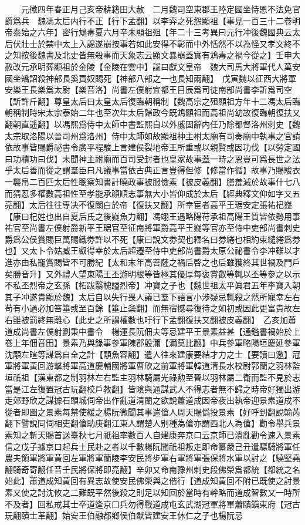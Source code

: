 　　元徽四年春正月己亥帝耕籍田大赦　二月魏司空東郡王陸定國坐恃恩不法免官爵爲兵　魏馮太后内行不正【行下孟翻】以李弈之死怨顯祖【事見一百三十二卷明帝泰始之六年】密行鴆毒夏六月辛未顯祖殂【年二十三考異曰元行冲後魏國典云太后伏壯士於禁中太上入謁遂崩按事若如此安得不彰而中外恬然不以為怪又孝文終不之知按後魏書及北史皆無殺事而天象志云顯文暴崩蓋實有鴆毒之禍今從之】壬申大赦改元承明葬顯祖於金陵【金陵在雲中】諡曰獻文皇帝　魏大司馬大將軍代人萬安國坐矯詔殺神部長奚買奴賜死【神部八部之一也長知兩翻】　戊寅魏以征西大將軍安樂王長樂爲太尉【樂音洛】尚書左僕射宜都王目辰爲司徒南部尚書李訢爲司空【訢許斤翻】尊皇太后曰太皇太后復臨朝稱制【魏高宗之殂顯祖方年十二馮太后臨朝稱制時宋太宗泰始二年也至次年太后歸政今既鴆顯祖而高祖尚幼故復臨朝復扶又翻朝直遥翻】以馮熙爲侍中太師中書監熙自以外戚固辭内任乃除都督洛州刺史【魏太宗取洛陽以晉司州爲洛州】侍中太師如故顯祖神主袝太廟有司奏廟中執事之官請依故事皆賜爵祕書令廣平程駿上言建侯裂地帝王所重或以親賢或因功伐【以勞定國曰功積功曰伐】未聞神主祔廟而百司受封者也皇家故事蓋一時之恩豈可爲長世之法乎太后善而從之謂羣臣曰凡議事當依古典正言豈得但修【修當作循】故事乃賜駿衣一襲帛二百匹太后性聰察知書計曉政事被服儉素【被皮義翻】膳羞減於故事什七八而猜忍多權數高祖性至孝能承顔順志事無大小皆仰成於太后【經典釋文仰如字又五亮翻】太后往往專决不復關白於帝【復扶又翻】所幸宦者高平王琚安定張祐杞嶷【康曰杞姓也出自夏后氏之後嶷魚力翻】馮翊王遇略陽苻承祖高陽王質皆依勢用事祐官至尚書左僕射爵新平王琚官至征南將軍爵高平王嶷等官亦至侍中吏部尚書刺史爵爲公侯賞賜巨萬賜鐵劵許以不死【康曰說文劵契也釋名曰劵綣也相約束繾綣爲劵也】又太卜令姑臧王叡得幸於太后超遷至侍中吏部尚書爵太原公祕書令李冲雖以才進亦由私寵賞賜皆不可勝紀【太和末年高菩薩之禍后啓之也后雖獲終其世禍及門戶矣勝音升】又外禮人望東陽王丕游明根等皆極其優厚每褒賞叡等輒以丕等參之以示不私丕烈帝之玄孫【柘跋翳槐謚烈帝】冲寶之子也【魏世祖太平眞君五年李寶入朝其子冲遂貴顯於魏】太后自以失行畏人議已羣下語言小涉疑忌輒殺之然所寵幸左右苟有小過必加笞箠或至百餘【箠止橤翻】而無宿憾尋復待之如初或因此更富貴故左右雖被罰終無離心【此史之所謂權數也吁行下孟翻復扶又翻被皮義翻】　乙亥加蕭道成尚書左僕射劉秉中書令　楊運長阮佃夫等忌建平王景素益甚【通鑑書禍始於上卷上年佃音田】景素乃與錄事參軍陳郡殷濔【濔莫比翻】中兵參軍略陽垣慶延參軍沈顒左暄等謀爲自全之計【顒魚容翻】遣人往來建康要結才力之士【要讀曰邀】冠軍將軍黃回游擊將軍高道慶輔國將軍曹欣之前軍將軍韓道清長水校尉郭蘭之羽林監垣祇祖【漢東都之制羽林左右監主羽林騎屬光祿勲至晉以羽林屬二衛而監不見於志當是江左復置冠古玩翻校戶教翻】皆隂與通謀武人不得志者無不歸之時帝好獨出游走郊野欣之謀據石頭城伺帝出作亂道清蘭之欲說蕭道成因帝夜出執帝迎景素道成不從者即圖之景素每禁使緩之楊阮微聞其事遣傖人周天賜僞投景素【好呼到翻說輸芮翻下譬說同伺相吏翻傖助庚翻江東人謂楚人别種為傖亦謂西北人為傖】勸令舉兵景素知之斬天賜首送臺秋七月祇祖率數百人自建康奔京口云京師已潰亂勸令速入景素信之戊子據京口起兵士民赴之者以千數楊阮聞祇祖叛走即命纂嚴己丑遣驃騎將軍任農夫領軍將軍黃回左軍將軍蘭陵李安民將步軍右軍將軍張保將水軍以討之【驍堅堯翻騎奇寄翻任音壬民將保將即亮翻】辛卯又命南豫州刺史段佛榮爲都統【都統之名始此】蕭道成知黃回有異志故使安民佛榮與之偕行【道成知黃回不附已既使之討景素又使之討沈攸之二難既平然後殺之則足以知回於當時有幹略而道成智數又一時所不及者】回私戒其士卒道逢京口兵勿得戰道成屯玄武湖冠軍將軍蕭賾鎭東府【冠古玩翻賾士革翻】始安王伯融都鄉侯伯猷皆建安王休仁之子也楊阮忌